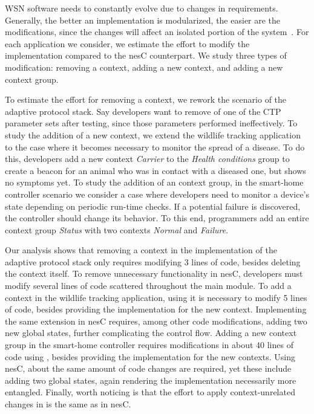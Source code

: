 WSN software needs to constantly evolve due to changes in
requirements. Generally, the better an implementation is modularized,
the easier are the modifications, since the changes will affect an
isolated portion of the system~\cite{koopman10:better}. For each
application we consider, we estimate the effort to modify the \conesc
implementation compared to the nesC counterpart. We study three types
of modification: removing a context, adding a new context, and adding
a new context group.

To estimate the effort for removing a context, we rework the scenario
of the adaptive protocol stack. Say developers want to remove of one
of the CTP parameter sets after testing, since those parameters
performed ineffectively. To study the addition of a new context, we
extend the wildlife tracking application to the case where it becomes
necessary to monitor the spread of a disease. To do this, developers
add a new context \emph{Carrier} to the \emph{Health conditions} group
to create a beacon for an animal who was in contact with a diseased
one, but shows no symptoms yet. To study the addition of an context
group, in the smart-home controller scenario we consider a case where
developers need to monitor a device's state depending on periodic
run-time checks. If a potential failure is discovered, the controller
should change its behavior. To this end, programmers add an entire
context group \emph{Status} with two contexts \emph{Normal} and
\emph{Failure}.

 Our analysis shows that removing a context in the
\conesc implementation of the adaptive protocol stack only requires
modifying 3 lines of code, besides deleting the context itself. To
remove unnecessary functionality in nesC, developers must modify
several lines of code scattered throughout the main module. To add a
context in the wildlife tracking application, using \conesc it is
necessary to modify 5 lines of code, besides providing the
implementation for the new context. Implementing the same extension in
nesC requires, among other code modifications, adding two new global
states, further complicating the control flow. Adding a new context
group in the smart-home controller requires modifications in about 40
lines of code using \conesc, besides providing the implementation for
the new contexts. Using nesC, about the same amount of code changes
are required, yet these include adding two global states, again
rendering the implementation necessarily more entangled. Finally,
worth noticing is that the effort to apply context-unrelated changes
in \conesc is the same as in nesC.


